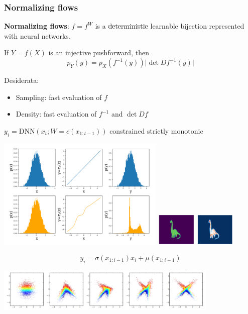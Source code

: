 \documentclass{beamer}
\begin{document}
\begin{frame}[allowframebreaks]
    \frametitle{Normalizing flows}

    \textbf{Normalizing flows}: $f = f^{W}$ is a \st{deterministic} learnable bijection
    represented with neural networks.

    \begin{lemma}
        If $Y = f(X)$ is an injective pushforward, then
        \[
            p_Y(y) = p_X(f^{-1}(y)) \lvert \det D f^{-1}(y) \rvert
        \]
    \end{lemma}

    Desiderata:
    \begin{itemize}
        \item Sampling: fast evaluation of $f$
        \item Density: fast evaluation of $f^{-1}$ and $\det D f$
    \end{itemize}

    \framebreak

    \begin{example}
        $y_i = \text{DNN}(x_t; W=c(x_{1:t-1}))$
        constrained strictly monotonic
        \begin{center}
            \includegraphics[width=0.6\textwidth]{Figures/naf.png}
            \vfill
            \includegraphics[width=0.3\textwidth]{Figures/dino.png}
        \end{center}
    \end{example}

    \framebreak

    \begin{example}
        \[
            y_i = \sigma(x_{1:i-1}) x_i + \mu(x_{1:i-1})
        \]
        \begin{center}
            \includegraphics[width=0.8\textwidth]{Figures/nf-example.png}
        \end{center}
    \end{example}

\end{frame}
\end{document}
